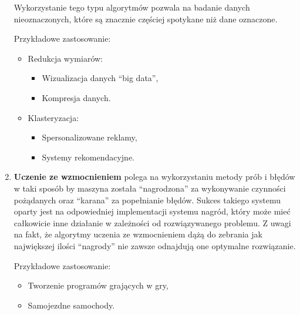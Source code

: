 \begin{enumerate}
\begin{enumerate}
    \end{enumerate} 
    Wykorzystanie tego typu algorytmów pozwala na badanie danych nieoznaczonych,
    które są znacznie częściej spotykane niż dane oznaczone.
    
    Przykładowe zastosowanie:
    \begin{itemize}
        \item Redukcja wymiarów:
        \begin{itemize}
            \item Wizualizacja danych ``big data'',
            \item Kompresja danych.
        \end{itemize}
        \item Klasteryzacja:
        \begin{itemize}
            \item Spersonalizowane reklamy,
            \item Systemy rekomendacyjne.
        \end{itemize}
    \end{itemize}
    \item \textbf{Uczenie ze wzmocnieniem}
    polega na wykorzystaniu metody prób i błędów w taki sposób by maszyna została
    ``nagrodzona'' za wykonywanie czynności pożądanych oraz ``karana'' za popełnianie błędów. 
    Sukces takiego systemu oparty jest na odpowiedniej implementacji systemu nagród, który może 
    mieć całkowicie inne działanie w zależności od rozwiązywanego problemu. 
    Z uwagi na fakt, że algorytmy uczenia ze wzmocnieniem dążą do zebrania jak największej
    ilości ``nagrody'' nie zawsze odnajdują one optymalne rozwiązanie.
    
    Przykładowe zastosowanie:
    \begin{itemize}
        \item Tworzenie programów grających w gry,
        \item Samojezdne samochody.
    \end{itemize}
\end{enumerate} 

